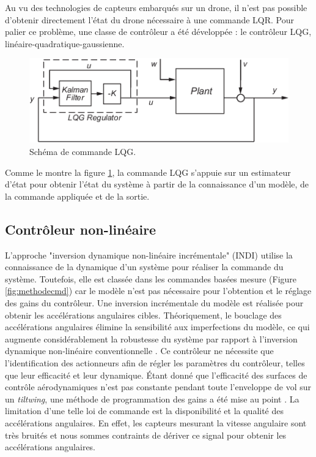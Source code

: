 
    Au vu des technologies de capteurs embarqués sur un drone, il n'est pas possible d'obtenir directement l'état du drone nécessaire à une commande LQR. Pour palier ce problème, une classe de contrôleur a été développée : le contrôleur LQG, linéaire-quadratique-gaussienne. 
    \begin{figure}[H]
        \centerline{
        \includegraphics[trim=0cm 0cm 0cm 0cm,clip,width=0.6\columnwidth]{figures/regulator.png}}
        \caption{Schéma de commande LQG.}
        \label{fig:LQG}
    \end{figure}

    Comme le montre la figure \ref{fig:LQG}, la commande LQG s'appuie sur un estimateur d'état pour obtenir l'état du système à partir de la connaissance d'un modèle, de la commande appliquée et de la sortie. 



\subsection*{Contrôleur non-linéaire}

L'approche "inversion dynamique non-linéaire incrémentale" (INDI) utilise la connaissance de la dynamique d'un système pour réaliser la commande du système. Toutefois, elle est classée dans les commandes basées mesure (Figure \ref{fig:methodecmd}) car le modèle n'est pas nécessaire pour l'obtention et le réglage des gains du contrôleur. Une inversion incrémentale du modèle est réalisée pour obtenir les accélérations angulaires cibles. Théoriquement, le bouclage des accélérations angulaires élimine la sensibilité aux imperfections du modèle, ce qui augmente considérablement la robustesse du système par rapport à l'inversion dynamique non-linéaire conventionnelle \cite{Sieberling2010, Binz2019}. Ce contrôleur ne nécessite que l'identification des actionneurs afin de régler les paramètres du contrôleur, telles que leur efficacité et leur dynamique. Étant donné que l'efficacité des surfaces de contrôle aérodynamiques n'est pas constante pendant toute l'enveloppe de vol sur un \textit{tiltwing}, une méthode de programmation des gains a été mise au point \cite{smeurINDI,smeurINDITail}.
La limitation d'une telle loi de commande est la disponibilité et la qualité  des accélérations angulaires. En effet, les capteurs mesurant la vitesse angulaire sont très bruités et nous sommes contraints de dériver ce signal pour obtenir les accélérations angulaires.



